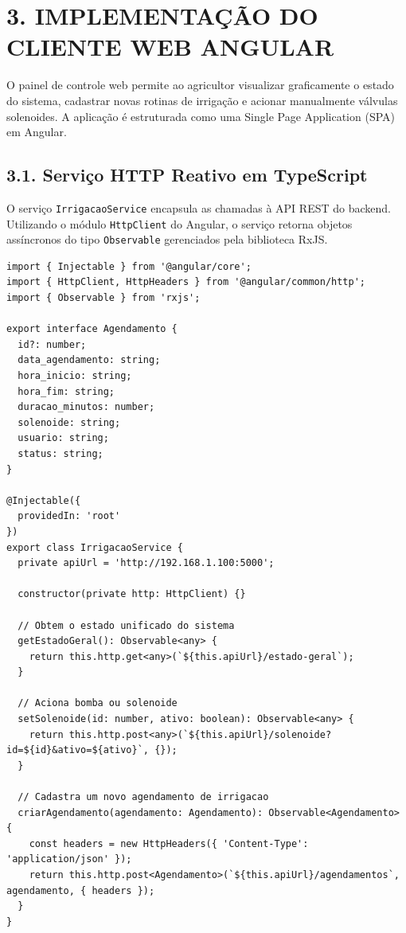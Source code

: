 \newpage

\section*{3. IMPLEMENTAÇÃO DO CLIENTE WEB ANGULAR}

O painel de controle web permite ao agricultor visualizar graficamente o estado do sistema, cadastrar novas rotinas de irrigação e acionar manualmente válvulas solenoides. A aplicação é estruturada como uma Single Page Application (SPA) em Angular.

\subsection*{3.1. Serviço HTTP Reativo em TypeScript}

O serviço \texttt{IrrigacaoService} encapsula as chamadas à API REST do backend. Utilizando o módulo \texttt{HttpClient} do Angular, o serviço retorna objetos assíncronos do tipo \texttt{Observable} gerenciados pela biblioteca RxJS.

\begin{lstlisting}
import { Injectable } from '@angular/core';
import { HttpClient, HttpHeaders } from '@angular/common/http';
import { Observable } from 'rxjs';

export interface Agendamento {
  id?: number;
  data_agendamento: string;
  hora_inicio: string;
  hora_fim: string;
  duracao_minutos: number;
  solenoide: string;
  usuario: string;
  status: string;
}

@Injectable({
  providedIn: 'root'
})
export class IrrigacaoService {
  private apiUrl = 'http://192.168.1.100:5000';

  constructor(private http: HttpClient) {}

  // Obtem o estado unificado do sistema
  getEstadoGeral(): Observable<any> {
    return this.http.get<any>(`${this.apiUrl}/estado-geral`);
  }

  // Aciona bomba ou solenoide
  setSolenoide(id: number, ativo: boolean): Observable<any> {
    return this.http.post<any>(`${this.apiUrl}/solenoide?id=${id}&ativo=${ativo}`, {});
  }

  // Cadastra um novo agendamento de irrigacao
  criarAgendamento(agendamento: Agendamento): Observable<Agendamento> {
    const headers = new HttpHeaders({ 'Content-Type': 'application/json' });
    return this.http.post<Agendamento>(`${this.apiUrl}/agendamentos`, agendamento, { headers });
  }
}
\end{lstlisting}

